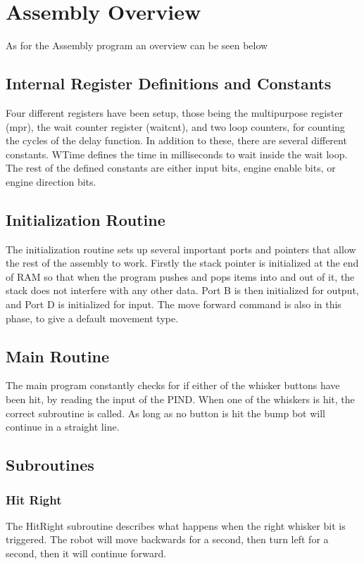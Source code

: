 \documentclass[12pt,letterpaper]{article}
\begin{document}
\section{Assembly Overview}
As for the Assembly program an overview can be seen below


\subsection{Internal Register Definitions and Constants}
Four different registers have been setup, those being the multipurpose register (mpr), the wait counter register (waitcnt), and two loop counters, for counting the cycles of the delay function. In addition to these, there are several different constants. WTime defines the time  in milliseconds to wait inside the wait loop. The rest of the defined constants are either input bits, engine enable bits, or engine direction bits.

\subsection{Initialization Routine}
The initialization routine sets up several important ports and pointers that allow the rest of the assembly to work. Firstly the stack pointer is initialized at the end of RAM so that when the program pushes and pops items into and out of it, the stack does not interfere with any other data. Port B is then initialized for output, and Port D is initialized for input. The move forward command is also in this phase, to give a default movement type.

\subsection{Main Routine}
The main program constantly checks for if either of the whisker buttons have been hit, by reading the input of the PIND. When one of the whiskers is hit, the correct subroutine is called. As long as no button is hit the bump bot will continue in a straight line.

\subsection{Subroutines}
	\subsubsection{Hit Right}
	The HitRight subroutine describes what happens when the right whisker bit is triggered. The robot will move backwards for a second, then turn left for a second, then it will continue forward. 
	
\end{document}

